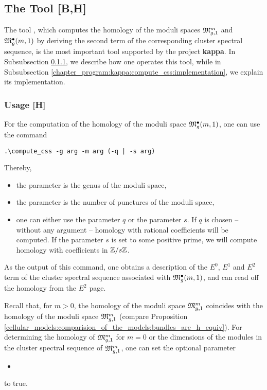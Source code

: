 \subsection{The Tool  [B,H]}
\label{chapter_program:kappa:compute_css}

The tool , which computes the homology of the moduli spaces $\Modspc[1]$ and $\ModspcRad[1]$
by deriving the second term of the corresponding cluster spectral sequence,
is the most important tool supported by the project {\bf kappa}.
In Subsubsection \ref{chapter_program:kappa:compute_css:usage}, we describe 
how one operates this tool, 
while in Subsubsection \ref{chapter_program:kappa:compute_css:implementation},
we explain its implementation. 

\subsubsection{Usage [H]}
\label{chapter_program:kappa:compute_css:usage}

For the computation of the homology of the moduli space $\ModspcRad[1]$, 
one can use the command
\begin{lstlisting}
.\compute_css -g arg -m arg (-q | -s arg)
\end{lstlisting}
Thereby,
\begin{itemize}
\item the parameter  is the genus of the moduli space,
\item the parameter  is the number of punctures of the moduli space,
\item one can either use the parameter $q$ or the parameter $s$. 
      If $q$ is chosen -- without any argument -- homology with rational coefficients will be computed.
      If the parameter $s$ is set to some positive prime, we will compute homology with coefficients in $\Z/s\Z$.
\end{itemize}
As the output of this command, one obtains a description of the $E^0$, $E^1$ and $E^2$ term of the cluster spectral sequence associated with $\ModspcRad[1]$,
and can read off the homology from the $E^2$ page.  

Recall that, for $m > 0$, the homology of the moduli space $\Modspc[1]$ coincides with the homology of the moduli space $\Modspc[1]$ 
(compare Proposition \ref{cellular_models:comparision_of_the_models:bundles_are_h_equiv}).
For determining the homology of $\Modspc[1]$ for $m = 0$ 
or the dimensions of the modules in the cluster spectral sequence of $\Modspc[1]$, one can set the optional parameter
\begin{itemize}
 \item {}
\end{itemize}
to true.

